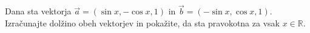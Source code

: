 \documentclass[addpoints]{exam}
\begin{document}
\begin{questions}


    \begin{solution}[10cm]

    \end{solution}





    \question[3]
    Dana sta vektorja $\overrightarrow{a}=(\sin x, -\cos x, 1)$ in $\overrightarrow{b}=(-\sin x, \cos x, 1)$.
    Izračunajte dolžino obeh vektorjev in pokažite, da sta pravokotna za vsak $x\in\mathbb{R}$.

    \begin{solution}[1cm]

    \end{solution}


\end{questions}
\end{document}
